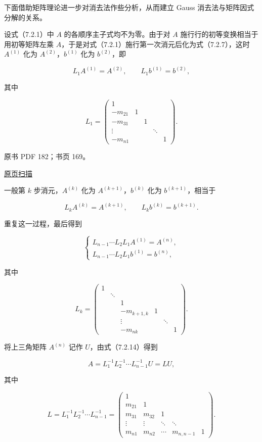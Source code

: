 \documentclass[
  10pt,
  fontset=fandol]{ctexart}
\begin{document}
下面借助矩阵理论进一步对消去法作些分析，从而建立 Gauss 消去法与矩阵因式分解的关系。

设式（7.2.1）中 \(A\) 的各顺序主子式均不为零。由于对 \(A\) 施行行的初等变换相当于用初等矩阵左乘 \(A\)，于是对式（7.2.1）施行第一次消元后化为式（7.2.7），这时 \(A^{(1)}\) 化为 \(A^{(2)}\)，\(b^{(1)}\) 化为 \(b^{(2)}\)，即

\[L_1A^{(1)}=A^{(2)},\qquad L_1b^{(1)}=b^{(2)},\]

其中

\[
L_1=\begin{pmatrix}
1&&&&\\
-m_{21}&1&&&\\
-m_{31}&&1&&\\
\vdots&&&\ddots&\\
-m_{n1}&&&&1
\end{pmatrix}.
\]

\clearpage

原书 PDF 182；书页 169。

\href{/Users/xiangjunfeng/Desktop/数值计算专用/numerical-analysis/book/source-images/pdf-182.jpeg}{原页扫描}

一般第 \(k\) 步消元，\(A^{(k)}\) 化为 \(A^{(k+1)}\)，\(b^{(k)}\) 化为 \(b^{(k+1)}\)，相当于

\[L_kA^{(k)}=A^{(k+1)},\qquad L_kb^{(k)}=b^{(k+1)}.\]

重复这一过程，最后得到

\[
\begin{cases}
L_{n-1}\cdots L_2L_1A^{(1)}=A^{(n)},\\
L_{n-1}\cdots L_2L_1b^{(1)}=b^{(n)},
\end{cases}
\tag{7.2.14}
\]

其中

\[
L_k=\begin{pmatrix}
1&&&&&\\
&\ddots&&&&\\
&&1&&&\\
&&-m_{k+1,k}&1&&\\
&&\vdots&&\ddots&\\
&&-m_{nk}&&&1
\end{pmatrix}.
\]

将上三角矩阵 \(A^{(n)}\) 记作 \(U\)，由式（7.2.14）得到

\[A=L_1^{-1}L_2^{-1}\cdots L_{n-1}^{-1}U=LU,\]

其中

\[
L=L_1^{-1}L_2^{-1}\cdots L_{n-1}^{-1}
=\begin{pmatrix}
1&&&&\\
m_{21}&1&&&\\
m_{31}&m_{32}&1&&\\
\vdots&\vdots&\ddots&\ddots&\\
m_{n1}&m_{n2}&\cdots&m_{n,n-1}&1
\end{pmatrix}.
\]
\end{document}
